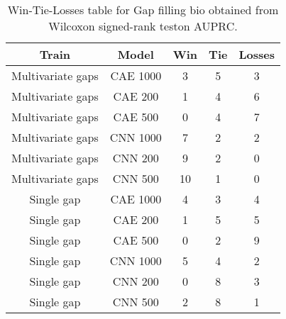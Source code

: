 \begin{table}[H]
\centering
\begin{tabular}{|c|c|c|c|c|}

    \textbf{Train} & \textbf{Model} &  \textbf{Win} &  \textbf{Tie} &  \textbf{Losses} \\
\hline

 Multivariate gaps &       CAE 1000 &             3 &             5 &                3 \\
\hline
 Multivariate gaps &        CAE 200 &             1 &             4 &                6 \\
\hline
 Multivariate gaps &        CAE 500 &             0 &             4 &                7 \\
\hline
 Multivariate gaps &       CNN 1000 &             7 &             2 &                2 \\
\hline
 Multivariate gaps &        CNN 200 &             9 &             2 &                0 \\
\hline
 Multivariate gaps &        CNN 500 &            10 &             1 &                0 \\
\hline
        Single gap &       CAE 1000 &             4 &             3 &                4 \\
\hline
        Single gap &        CAE 200 &             1 &             5 &                5 \\
\hline
        Single gap &        CAE 500 &             0 &             2 &                9 \\
\hline
        Single gap &       CNN 1000 &             5 &             4 &                2 \\
\hline
        Single gap &        CNN 200 &             0 &             8 &                3 \\
\hline
        Single gap &        CNN 500 &             2 &             8 &                1 \\
\hline

\end{tabular}
\caption{Win-Tie-Losses table for Gap filling bio obtained from Wilcoxon signed-rank teston AUPRC.}
\label{tab:gap_filling_bio_model_training_data_comparison}
\end{table}